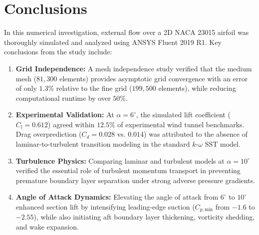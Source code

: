 \documentclass[11pt,a4paper]{article}
\begin{document}
\section{Conclusions}
In this numerical investigation, external flow over a 2D NACA 23015 airfoil was thoroughly simulated and analyzed using ANSYS Fluent 2019 R1. Key conclusions from the study include:
\begin{enumerate}
    \item \textbf{Grid Independence:} A mesh independence study verified that the medium mesh ($81,300$ elements) provides asymptotic grid convergence with an error of only $1.3\%$ relative to the fine grid ($199,500$ elements), while reducing computational runtime by over $50\%$.
    \item \textbf{Experimental Validation:} At $\alpha = 6^\circ$, the simulated lift coefficient ($C_l = 0.612$) agreed within $12.5\%$ of experimental wind tunnel benchmarks. Drag overprediction ($C_d = 0.028$ vs. $0.014$) was attributed to the absence of laminar-to-turbulent transition modeling in the standard $k\text{-}\omega\text{ SST}$ model.
    \item \textbf{Turbulence Physics:} Comparing laminar and turbulent models at $\alpha = 10^\circ$ verified the essential role of turbulent momentum transport in preventing premature boundary layer separation under strong adverse pressure gradients.
    \item \textbf{Angle of Attack Dynamics:} Elevating the angle of attack from $6^\circ$ to $10^\circ$ enhanced section lift by intensifying leading-edge suction ($C_{p,\text{min}}$ from $-1.6$ to $-2.55$), while also initiating aft boundary layer thickening, vorticity shedding, and wake expansion.
\end{enumerate}
\end{document}
